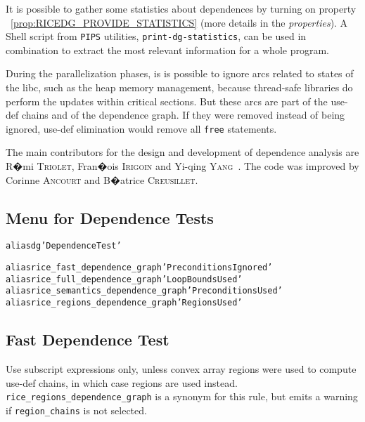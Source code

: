\documentclass[a4paper]{report}
\newenvironment{PipsMake}{\begin{alltt}}{\end{alltt}}
\newcommand{\PipsPropRef}[1]{\texttt{\detokenize{#1}}~\ref{prop:#1}}
\newenvironment{PipsPass}[1]{\label{pass:#1}}{}
\newcommand{\Pips}{\texttt{PIPS}}
\newcommand{\PROPERTIES}{{\em properties}}
\begin{document}
\begin{PipsPass}{dg}
It is possible to gather some statistics about dependences by turning
on property \PipsPropRef{RICEDG_PROVIDE_STATISTICS} (more details in the
\PROPERTIES{}). A Shell script from \Pips{} utilities,
\verb/print-dg-statistics/, can be used in combination to extract the
most relevant information for a whole program.

During the parallelization phases, is is possible to ignore arcs
related to states of the libc, such as the heap memory management,
because thread-safe libraries do perform the updates within critical
sections. But these arcs are part of the use-def chains and of the
dependence graph. If they were removed instead of being ignored,
use-def elimination would remove all \verb/free/ statements.

The main contributors for the design and development of dependence
analysis are R�mi \textsc{Triolet}, Fran�ois \textsc{Irigoin} and Yi-qing
\textsc{Yang}~\cite{Yan93}. The code was improved by Corinne
\textsc{Ancourt} and B�atrice \textsc{Creusillet}.
\end{PipsPass}

\subsection{Menu for Dependence Tests}
\label{subsubsection-menu-for-dependence-tests}

\begin{PipsMake}
alias dg 'Dependence Test'

alias rice_fast_dependence_graph 'Preconditions Ignored'
alias rice_full_dependence_graph 'Loop Bounds Used'
alias rice_semantics_dependence_graph 'Preconditions Used'
alias rice_regions_dependence_graph 'Regions Used'
\end{PipsMake}

\subsection{Fast Dependence Test}
\label{subsubsection-fast-dependence-test}

\begin{PipsPass}{rice_fast_dependence_graph}
Use subscript expressions only, unless convex array regions were used to compute
use-def chains, in which case regions are used instead. {\tt
  rice\_regions\_dependence\_graph} is a synonym for this rule, but emits a
warning if {\tt region\_chains} is not selected.
\end{PipsPass}
\end{document}
